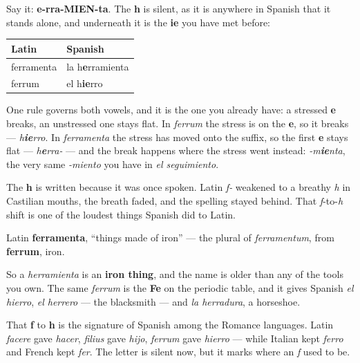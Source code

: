\begin{grammarlens}[title={Grammar Lens: the h that hides a diphthong}]
Say it: \textbf{e-rra-MIEN-ta}. The \textbf{h} is silent, as it is anywhere in Spanish that it stands alone, and underneath it is the \textbf{ie} you have met before:

\noindent
\begin{tabularx}{\linewidth}{@{}>{\raggedright\arraybackslash}X>{\raggedright\arraybackslash}X@{}}
\toprule
\textbf{Latin} & \textbf{Spanish} \\
\midrule
ferramenta & la h\textbf{e}rramienta \\
ferrum & el h\textbf{ie}rro \\
\bottomrule
\end{tabularx}

One rule governs both vowels, and it is the one you already have: a stressed \textbf{e} breaks, an unstressed one stays flat. In \emph{ferrum} the stress is on the \textbf{e}, so it breaks — \emph{h\textbf{ie}rro}. In \emph{ferramenta} the stress has moved onto the suffix, so the first \textbf{e} stays flat — \emph{h\textbf{e}rra-} — and the break happens where the stress went instead: \emph{-m\textbf{ie}nta}, the very same \emph{-miento} you have in \emph{el seguimiento}.

The \textbf{h} is written because it was once spoken. Latin \emph{f-} weakened to a breathy \emph{h} in Castilian mouths, the breath faded, and the spelling stayed behind. That \emph{f}-to-\emph{h} shift is one of the loudest things Spanish did to Latin.
\end{grammarlens}

\begin{cousinweb}
Latin \textbf{ferramenta}, \textquotedblleft{}things made of iron\textquotedblright{} — the plural of \emph{ferramentum}, from \textbf{ferrum}, iron.

So a \emph{herramienta} is an \textbf{iron thing}, and the name is older than any of the tools you own. The same \emph{ferrum} is the \textbf{Fe} on the periodic table, and it gives Spanish \emph{el hierro}, \emph{el herrero} — the blacksmith — and \emph{la herradura}, a horseshoe.

That \textbf{f} to \textbf{h} is the signature of Spanish among the Romance languages. Latin \emph{facere} gave \emph{hacer}, \emph{filius} gave \emph{hijo}, \emph{ferrum} gave \emph{hierro} — while Italian kept \emph{ferro} and French kept \emph{fer}. The letter is silent now, but it marks where an \emph{f} used to be.
\end{cousinweb}


